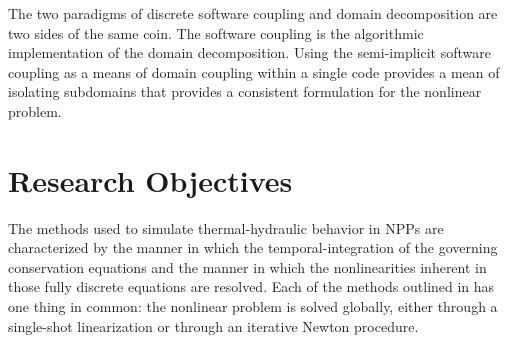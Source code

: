 The two paradigms of discrete software coupling and domain decomposition are two sides of the same coin.
The software coupling is the algorithmic implementation of the domain decomposition.
Using the semi-implicit software coupling as a means of domain coupling within a single code provides a mean of isolating subdomains that provides a consistent formulation for the nonlinear problem.

\section{Research Objectives}

The methods used to simulate thermal-hydraulic behavior in NPPs are characterized by the manner in which the temporal-integration of the governing conservation equations and the manner in which the nonlinearities inherent in those fully discrete equations are resolved.
Each of the methods outlined in  has one thing in common: the nonlinear problem is solved globally, either through a single-shot linearization or through an iterative Newton procedure.

